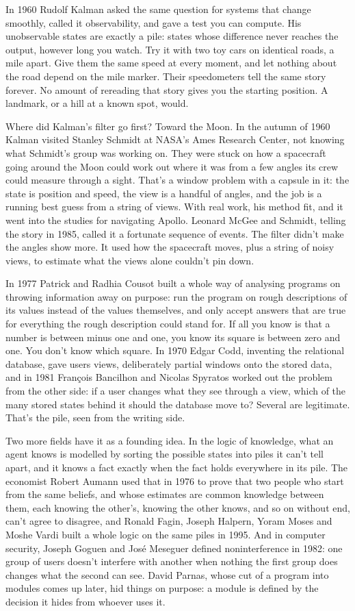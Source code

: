 \documentclass[11pt,twoside]{article}
\theoremstyle{thielethm}
\theoremstyle{thieledef}
\theoremstyle{thieledef}
\theoremstyle{thieledef}
\theoremstyle{thielethm}
\theoremstyle{thieleobs}
\theoremstyle{thielethm}
\begin{document}
In 1960 Rudolf Kalman asked the same question for systems that change smoothly, called it observability, and gave a test you can compute. His unobservable states are exactly a pile: states whose difference never reaches the output, however long you watch. Try it with two toy cars on identical roads, a mile apart. Give them the same speed at every moment, and let nothing about the road depend on the mile marker. Their speedometers tell the same story forever. No amount of rereading that story gives you the starting position. A landmark, or a hill at a known spot, would.

Where did Kalman's filter go first? Toward the Moon. In the autumn of 1960 Kalman visited Stanley Schmidt at NASA's Ames Research Center, not knowing what Schmidt's group was working on. They were stuck on how a spacecraft going around the Moon could work out where it was from a few angles its crew could measure through a sight. That's a window problem with a capsule in it: the state is position and speed, the view is a handful of angles, and the job is a running best guess from a string of views. With real work, his method fit, and it went into the studies for navigating Apollo. Leonard McGee and Schmidt, telling the story in 1985, called it a fortunate sequence of events. The filter didn't make the angles show more. It used how the spacecraft moves, plus a string of noisy views, to estimate what the views alone couldn't pin down.

In 1977 Patrick and Radhia Cousot built a whole way of analysing programs on throwing information away on purpose: run the program on rough descriptions of its values instead of the values themselves, and only accept answers that are true for everything the rough description could stand for. If all you know is that a number is between minus one and one, you know its square is between zero and one. You don't know which square. In 1970 Edgar Codd, inventing the relational database, gave users views, deliberately partial windows onto the stored data, and in 1981 François Bancilhon and Nicolas Spyratos worked out the problem from the other side: if a user changes what they see through a view, which of the many stored states behind it should the database move to? Several are legitimate. That's the pile, seen from the writing side.

Two more fields have it as a founding idea. In the logic of knowledge, what an agent knows is modelled by sorting the possible states into piles it can't tell apart, and it knows a fact exactly when the fact holds everywhere in its pile. The economist Robert Aumann used that in 1976 to prove that two people who start from the same beliefs, and whose estimates are common knowledge between them, each knowing the other's, knowing the other knows, and so on without end, can't agree to disagree, and Ronald Fagin, Joseph Halpern, Yoram Moses and Moshe Vardi built a whole logic on the same piles in 1995. And in computer security, Joseph Goguen and José Meseguer defined noninterference in 1982: one group of users doesn't interfere with another when nothing the first group does changes what the second can see. David Parnas, whose cut of a program into modules comes up later, hid things on purpose: a module is defined by the decision it hides from whoever uses it.
\end{document}
